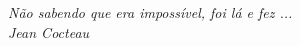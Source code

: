 \begin{epigrafe}
    \vspace*{\fill}
	\begin{flushright}
\textit{ Não sabendo que era impossível, foi lá e fez ...\\ Jean Cocteau}
	\end{flushright}
\end{epigrafe}
